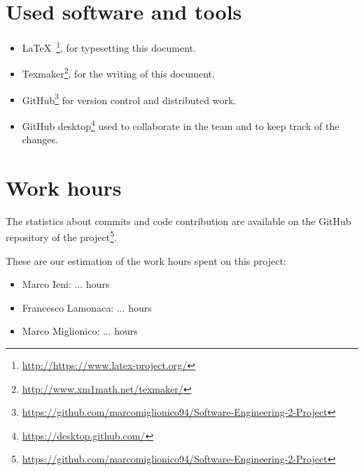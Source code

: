 \section{Used software and tools}
\begin{itemize}
    \item \LaTeX\ \footnote{\url{http://https://www.latex-project.org/}}, for typesetting this document.
    \item Texmaker\footnote{\url{http://www.xm1math.net/texmaker/}}, for the writing of this document.
    \item GitHub\footnote{\url{https://github.com/marcomiglionico94/Software-Engineering-2-Project}} for version control and distributed work.
   \item GitHub desktop\footnote{\url{https://desktop.github.com/}} used to collaborate in the team and to keep track of the changes. 
\end{itemize}

\section{Work hours}
The statistics about commits and code contribution are available on the GitHub repository of the project\footnote{\url{https://github.com/marcomiglionico94/Software-Engineering-2-Project}}.

These are our estimation of the work hours spent on this project:
\begin{itemize}
    \item Marco Ieni: ... hours
    \item Francesco Lamonaca: ... hours
    \item Marco Miglionico: ... hours
\end{itemize}

